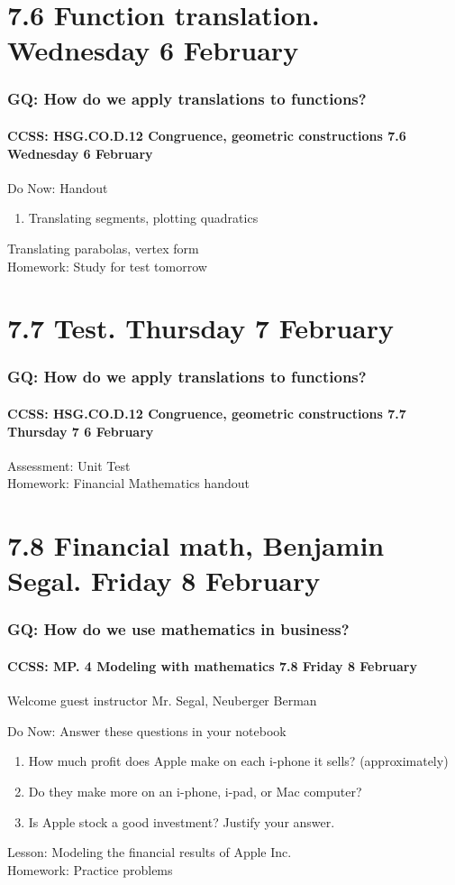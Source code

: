 \documentclass{beamer}
\begin{document}
\section{7.6 Function translation. Wednesday 6 February}
  \frame
  {
    \frametitle{GQ: How do we apply translations to functions?}
    \framesubtitle{CCSS: HSG.CO.D.12 Congruence, geometric constructions \hfill \alert{7.6 Wednesday 6 February}}

    \begin{block}{Do Now: Handout}
      \begin{enumerate}
        \item Translating segments, plotting quadratics
      \end{enumerate}
    \end{block}
    Translating parabolas, vertex form\\[0.5cm]
    Homework: Study for \alert{test tomorrow}
  }

\section{7.7 Test. Thursday 7 February}
  \frame
  {
    \frametitle{GQ: How do we apply translations to functions?}
    \framesubtitle{CCSS: HSG.CO.D.12 Congruence, geometric constructions \hfill \alert{7.7 Thursday 7 6 February}}


    Assessment: Unit Test\\[0.5cm]
    Homework: Financial Mathematics handout
  }

\section{7.8 Financial math, Benjamin Segal. Friday 8 February}
  \frame
  {
    \frametitle{GQ: How do we use mathematics in business?}
    \framesubtitle{CCSS: MP. 4 Modeling with mathematics \hfill \alert{7.8 Friday 8 February}}
    Welcome guest instructor Mr. Segal, Neuberger Berman\\[0.5cm]
    \begin{block}{Do Now: Answer these questions in your notebook}
      \begin{enumerate}
        \item How much profit does Apple make on each i-phone it sells? (approximately)
        \item Do they make more on an i-phone, i-pad, or Mac computer?
        \item Is Apple stock a good investment? Justify your answer.
      \end{enumerate}
    \end{block}
    Lesson: Modeling the financial results of Apple Inc.\\[0.5cm]
    Homework: Practice problems
  }
\end{document}

